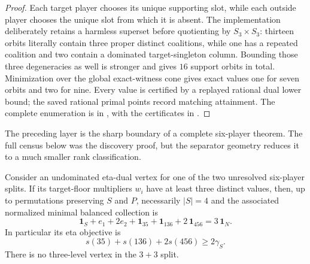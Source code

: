 \begin{proof}
Each target player chooses its unique supporting slot, while each outside
player chooses the unique slot from which it is absent.  The implementation
deliberately retains a harmless superset before quotienting by
$S_3\times S_3$: thirteen orbits literally contain three proper distinct
coalitions, while one has a repeated coalition and two contain a dominated
target-singleton column.  Bounding those three degeneracies as well is
stronger and gives $16$ support orbits in total.  Minimization over the global exact-witness cone gives
exact values one for seven orbits and two for nine.  Every value is certified
by a replayed rational dual lower bound; the saved rational primal points
record matching attainment.  The complete
enumeration is in , with the
certificates in .
\end{proof}

The preceding layer is the sharp boundary of a complete six-player theorem.
The full census below was the discovery proof, but the separator geometry
reduces it to a much smaller rank classification.

\begin{lemma}
\label{lem:lx-n6-three-level-classification}
Consider an undominated eta-dual vertex for one of the two unresolved
six-player splits.  If its target-floor multipliers $w_i$ have at least three
distinct values, then, up to permutations preserving $S$ and $P$, necessarily
$|S|=4$ and the associated normalized minimal balanced collection is
\[
 \mathbf1_S+e_1+2e_2+\mathbf1_{35}+\mathbf1_{136}
     +2\,\mathbf1_{456}=3\,\mathbf1_N.             \tag{TL}
 \label{eq:lx-n6-exceptional-three-level}
\]
In particular its eta objective is
\[
 s(35)+s(136)+2s(456)\geq2\gamma_S.
 \tag{TC}\label{eq:lx-n6-exceptional-cost}
\]
There is no three-level vertex in the $3+3$ split.
\end{lemma}

